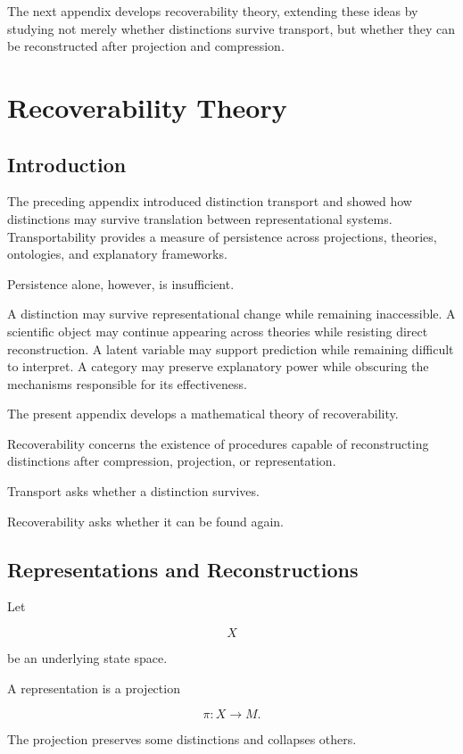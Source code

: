 \documentclass[11pt,oneside,openany]{book}
\begin{document}
The next appendix develops recoverability theory, extending these ideas by studying not merely whether distinctions survive transport, but whether they can be reconstructed after projection and compression.

\chapter{Recoverability Theory}

\section{Introduction}

The preceding appendix introduced distinction transport and showed how distinctions may survive translation between representational systems. Transportability provides a measure of persistence across projections, theories, ontologies, and explanatory frameworks.

Persistence alone, however, is insufficient.

A distinction may survive representational change while remaining inaccessible. A scientific object may continue appearing across theories while resisting direct reconstruction. A latent variable may support prediction while remaining difficult to interpret. A category may preserve explanatory power while obscuring the mechanisms responsible for its effectiveness.

The present appendix develops a mathematical theory of recoverability.

Recoverability concerns the existence of procedures capable of reconstructing distinctions after compression, projection, or representation.

Transport asks whether a distinction survives.

Recoverability asks whether it can be found again.

\section{Representations and Reconstructions}

Let

\[
X
\]

be an underlying state space.

A representation is a projection

\[
\pi:X\rightarrow M.
\]

The projection preserves some distinctions and collapses others.
\end{document}
